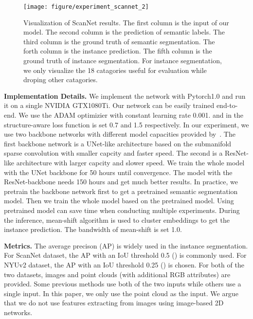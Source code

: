 \documentclass{article}
\begin{document}
\begin{figure*}[!t]
	\centering
	\texttt{[image: figure/experiment\_scannet\_2]}
	\caption{Visualization of ScanNet results. The first column is the input of our model. The second column is the prediction of semantic labels. The third column is the ground truth of semantic segmentation. The forth column is the instance prediction. The fifth column is the ground truth of instance segmentation. For instance segmentation, we only visualize the 18 catagories useful for evaluation while droping other catagories. 
	}
	\label{visualization_scannet}
\end{figure*}

\textbf{Implementation Details. } 
We implement the network with Pytorch1.0 and run it on a single NVIDIA GTX1080Ti. Our network can be easily trained end-to-end. We use the ADAM optimizier with constant learning rate 0.001.  and  in the structure-aware loss function is set 0.7 and 1.5 respectively. In our experiment, we use two backbone networks with different model capacities provided by~\cite{graham20183d}. The first backbone network is a UNet-like architecture based on the submanifold sparse convolution with smaller capcity and faster speed. The second is a ResNet-like architecture with larger capcity and slower speed. We train the whole model with the UNet backbone for 50 hours until convergence. The model with the ResNet-backbone needs 150 hours and get much better results. In practice, we pretrain the backbone network first to get a pretrained semantic segmentation model. Then we train the whole model based on the pretrained model. Using pretrained model can save time when conducting multiple experiments.
During the inference, 
mean-shift algorithm is used to cluster embeddings to get the instance prediction. The bandwidth of mean-shift is set 1.0.

\textbf{Metrics. } 
The average precison (AP) is widely used in the instance segmentation. For ScanNet dataset, the AP with an IoU threshold 0.5 () is commonly used. For NYUv2 dataset, the AP with an IoU threshold 0.25 () is chosen. For both of the two datasets, images and point clouds (with additional RGB attributes) are provided. Some previous methods use both of the two inputs while others use a single input. In this paper, we only use the point cloud as the input. We argue that we do not use features extracting from images using image-based 2D networks.
\end{document}
